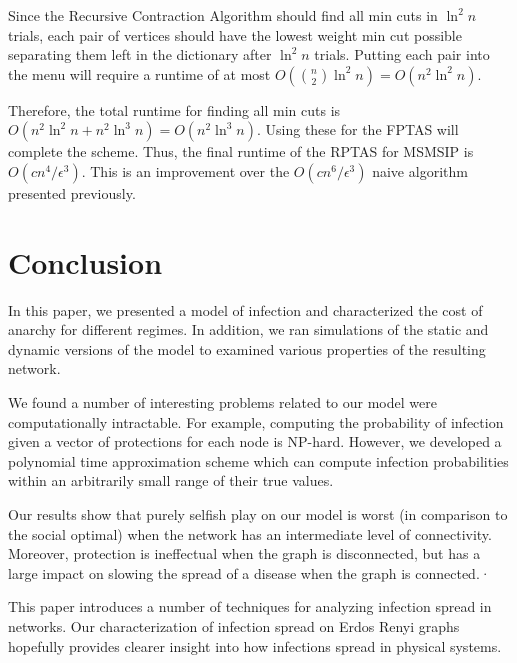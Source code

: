 \documentclass{article}
\theoremstyle{plain}
\begin{document}
Since the Recursive Contraction Algorithm should find all min cuts in $\ln^2 n$ trials, each pair of vertices should have the lowest weight min cut possible separating them left in the dictionary after $\ln^2 n$ trials. Putting each pair into the menu will require a runtime of at most $O \left( {n \choose 2} \ln^2 n \right) = O(n^2 \ln^2 n)$.

Therefore, the total runtime for finding all min cuts is $O(n^2 \ln^2 n + n^2 \ln^3 n) = O(n^2 \ln^3 n)$. Using these for the FPTAS will complete the scheme. Thus, the final runtime of the RPTAS for MSMSIP is $O(c n^4 / \epsilon^3)$. This is an improvement over the $O(c n^6 / \epsilon^3)$ naive algorithm presented previously.

\section{Conclusion}

In this paper, we presented a model of infection and characterized the cost of anarchy for different regimes. In addition, we ran simulations of the static and dynamic versions of the model to examined various properties of the resulting network.

We found a number of interesting problems related to our model were computationally intractable. For example, computing the probability of infection given a vector of protections for each node is NP-hard. However, we developed a polynomial time approximation scheme which can compute infection probabilities within an arbitrarily small range of their true values.

Our results show that purely selfish play on our model is worst (in comparison to the social optimal) when the network has an intermediate level of connectivity. Moreover, protection is ineffectual when the graph is disconnected, but has a large impact on slowing the spread of a disease when the graph is connected.·

This paper introduces a number of techniques for analyzing infection spread in networks. Our characterization of infection spread on Erdos Renyi graphs hopefully provides clearer insight into how infections spread in physical systems.

\newpage
\end{document}
